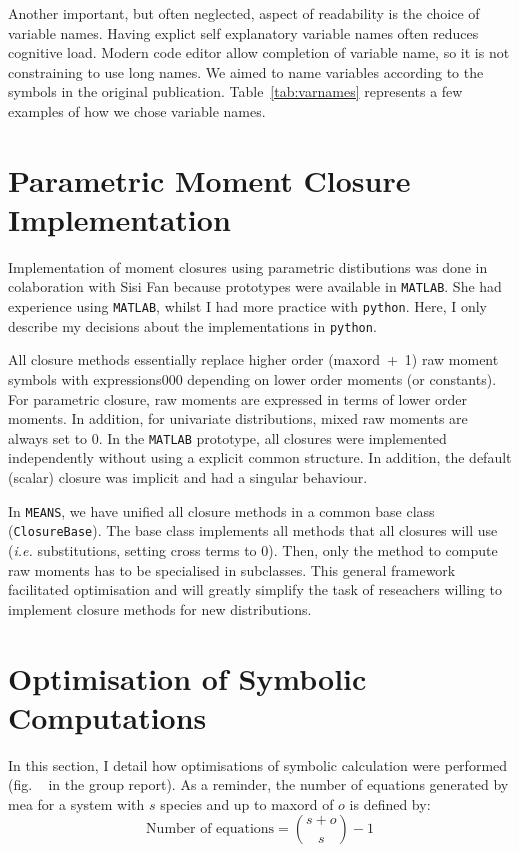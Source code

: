 \documentclass[11pt,a4paper]{article}
\newcommand{\means}{\texttt{MEANS}}
\newcommand{\py}{\texttt{python}}
\newcommand{\mat}{\texttt{MATLAB}}
\newcommand{\ie}{\emph{i.e.}}
\newcommand{\citationneeded}[2][]{\todo[color=brown, fancyline, #1]{\textbf{Citation Needed:} #2}}
\begin{document}
Another important, but often neglected, aspect of readability is the choice of variable names.
Having explict self explanatory variable names often reduces cognitive load.
Modern code editor allow completion of variable name, so it is not constraining to use long names.
We aimed to name variables according to the symbols in the original publication\cite{ale_general_2013}.
Table~\ref{tab:varnames} represents a few examples of how we chose variable names.


\section{Parametric Moment Closure Implementation}
Implementation of moment closures using parametric distibutions was done in colaboration 
with Sisi Fan because prototypes were available in \mat{}\cite{lakatos_preparation_2014}. She had experience using \mat{}, 
whilst I had more practice with \py{}.
Here, I only describe my decisions about the implementations in \py{}.

All closure methods essentially replace higher order (\gls{maxord}~+~1) raw moment symbols with expressions000 depending on lower order moments (or constants).
For parametric closure, raw moments are expressed in terms of lower order moments.
In addition, for univariate distributions, mixed raw moments are always set to $0$.
In the \mat{} prototype, all closures were implemented independently without using a explicit common structure.
In addition, the default (scalar) closure was implicit and had a singular behaviour.

In \means, we have unified all closure methods in a common base class (\texttt{ClosureBase}).
The base class implements all methods that all closures will use (\ie{} substitutions, setting cross terms to $0$).
Then, only the method to compute raw moments has to be specialised in subclasses.
This general framework facilitated optimisation and will greatly simplify the task of reseachers willing
to implement closure methods for new distributions.

\section{Optimisation of Symbolic Computations}

\label{sec:optimisation}

In this section, I detail how optimisations of symbolic calculation were performed (fig. ~\citationneeded{find me} in the group report).
As a reminder, the number of equations generated by \gls{mea} for a system with $s$ species and up to \gls{maxord} of $o$
is defined by:
\begin{equation}
    \text{Number of equations} = {{s + o} \choose {s}} - 1
    \label{eq:number_of_equations}
\end{equation}
\end{document}
